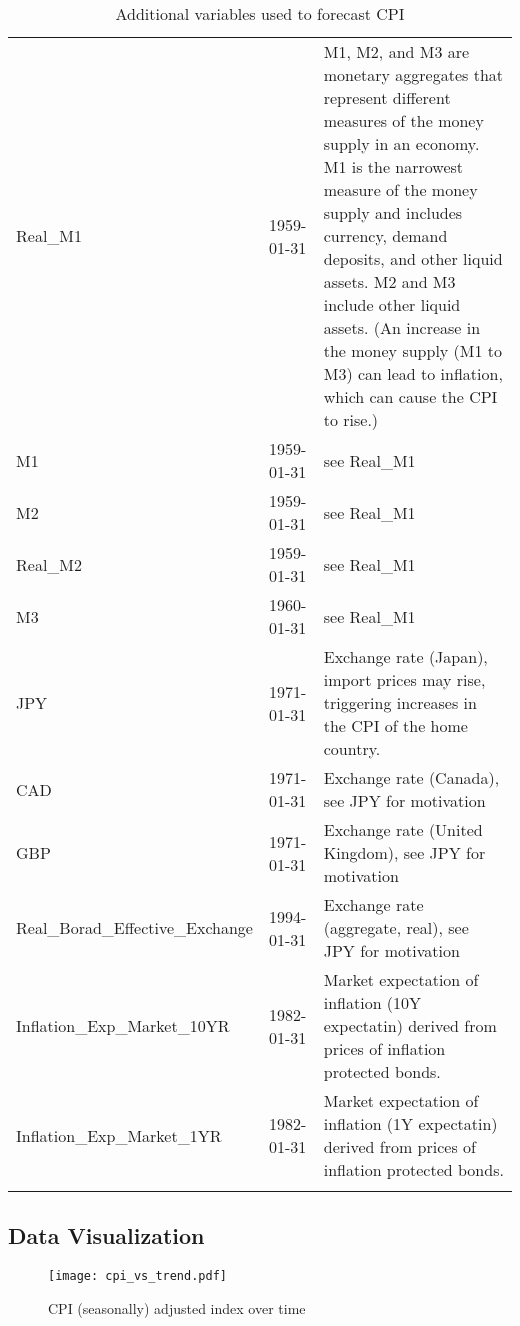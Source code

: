 \documentclass[12pt]{article}
\begin{document}
\begin{adjustwidth}{-2cm}{}
\begin{longtable}{llp{6cm}}
Real\_M1                             & 1959-01-31 & M1, M2, and M3 are monetary aggregates that represent different measures of the money supply in an economy. M1 is the narrowest measure of the money supply and includes currency, demand deposits, and other liquid assets. M2 and M3 include other liquid assets.  (An increase in the money supply (M1 to M3) can lead to inflation, which can cause the CPI to rise.)\\
M1                                     & 1959-01-31 & see Real\_M1\\
M2                           & 1959-01-31  & see Real\_M1 \\
Real\_M2                       & 1959-01-31 & see Real\_M1 \\
M3                                    & 1960-01-31  & see Real\_M1\\
JPY                                 & 1971-01-31 &  Exchange rate (Japan), import prices may rise, triggering increases in the CPI of the home country. \\
CAD                               & 1971-01-31 & Exchange rate (Canada), see JPY for motivation \\
GBP                                   & 1971-01-31  & Exchange rate (United Kingdom), see JPY for motivation \\
Real\_Borad\_Effective\_Exchange          & 1994-01-31 & Exchange rate (aggregate, real), see JPY for motivation \\
Inflation\_Exp\_Market\_10YR & 1982-01-31 & Market expectation of inflation (10Y expectatin) derived from prices of inflation protected bonds. \\
Inflation\_Exp\_Market\_1YR & 1982-01-31  & Market expectation of inflation (1Y expectatin) derived from prices of inflation protected bonds. \\

\bottomrule



\caption{Additional variables used to forecast CPI}
\label{table:motivation}
\end{longtable}
\end{adjustwidth}


\subsection{Data Visualization}

\begin{figure}[h]
    \centering
    \texttt{[image: cpi\_vs\_trend.pdf]}
    \caption{CPI (seasonally) adjusted index over time}
    \label{fig:cpi_vs_trend}
\end{figure}
\end{document}
